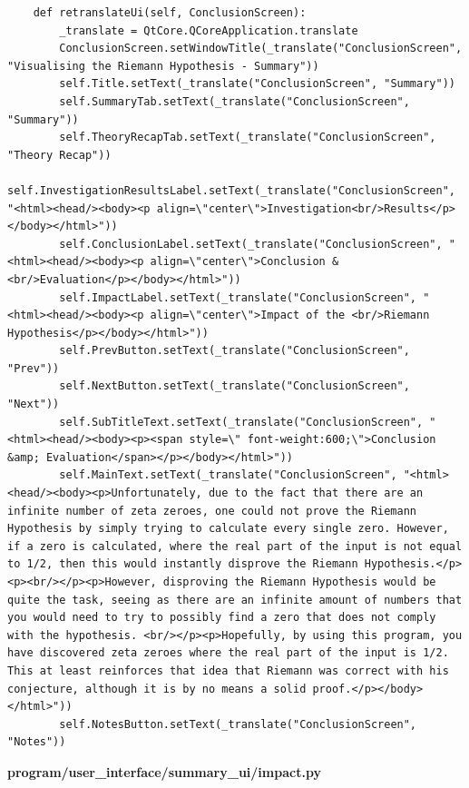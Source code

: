 \documentclass{article}
\begin{document}
\begin{lstlisting}
    def retranslateUi(self, ConclusionScreen):
        _translate = QtCore.QCoreApplication.translate
        ConclusionScreen.setWindowTitle(_translate("ConclusionScreen", "Visualising the Riemann Hypothesis - Summary"))
        self.Title.setText(_translate("ConclusionScreen", "Summary"))
        self.SummaryTab.setText(_translate("ConclusionScreen", "Summary"))
        self.TheoryRecapTab.setText(_translate("ConclusionScreen", "Theory Recap"))
        self.InvestigationResultsLabel.setText(_translate("ConclusionScreen", "<html><head/><body><p align=\"center\">Investigation<br/>Results</p></body></html>"))
        self.ConclusionLabel.setText(_translate("ConclusionScreen", "<html><head/><body><p align=\"center\">Conclusion & <br/>Evaluation</p></body></html>"))
        self.ImpactLabel.setText(_translate("ConclusionScreen", "<html><head/><body><p align=\"center\">Impact of the <br/>Riemann Hypothesis</p></body></html>"))
        self.PrevButton.setText(_translate("ConclusionScreen", "Prev"))
        self.NextButton.setText(_translate("ConclusionScreen", "Next"))
        self.SubTitleText.setText(_translate("ConclusionScreen", "<html><head/><body><p><span style=\" font-weight:600;\">Conclusion &amp; Evaluation</span></p></body></html>"))
        self.MainText.setText(_translate("ConclusionScreen", "<html><head/><body><p>Unfortunately, due to the fact that there are an infinite number of zeta zeroes, one could not prove the Riemann Hypothesis by simply trying to calculate every single zero. However, if a zero is calculated, where the real part of the input is not equal to 1/2, then this would instantly disprove the Riemann Hypothesis.</p><p><br/></p><p>However, disproving the Riemann Hypothesis would be quite the task, seeing as there are an infinite amount of numbers that you would need to try to possibly find a zero that does not comply with the hypothesis. <br/></p><p>Hopefully, by using this program, you have discovered zeta zeroes where the real part of the input is 1/2. This at least reinforces that idea that Riemann was correct with his conjecture, although it is by no means a solid proof.</p></body></html>"))
        self.NotesButton.setText(_translate("ConclusionScreen", "Notes"))
\end{lstlisting}


\textbf{program/user\_interface/summary\_ui/impact.py}
\end{document}
